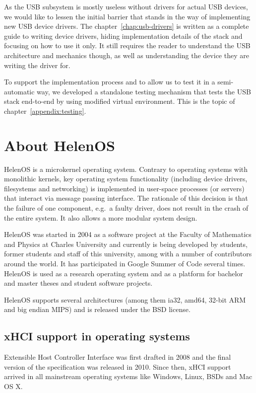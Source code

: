 As the USB subsystem is mostly useless without drivers for actual USB devices,
we would like to lessen the initial barrier that stands in the way of
implementing new USB device drivers. The chapter~\ref{chap:usb-drivers} is
written as a complete guide to writing device drivers, hiding implementation
details of the stack and focusing on how to use it only. It still requires the
reader to understand the USB architecture and mechanics though, as well as
understanding the device they are writing the driver for.

To support the implementation process and to allow us to test it in
a semi-automatic way, we developed a standalone testing mechanism that tests
the USB stack end-to-end by using modified virtual environment. This is the
topic of chapter~\ref{appendix:testing}.

\section{About HelenOS}
HelenOS is a microkernel operating system. Contrary to operating systems with
monolithic kernels, key operating system functionality (including device
drivers, filesystems and networking) is implemented in user-space processes (or
servers) that interact via message passing interface. The rationale of this
decision is that the failure of one component, e.g.\ a faulty driver, does not
result in the crash of the entire system. It also allows a more modular system
design.

HelenOS was started in 2004 as a software project at the Faculty of Mathematics
and Physics at Charles University and currently is being developed by students,
former students and staff of this university, among with a number of
contributors around the world. It has participated in Google Summer of Code
several times. HelenOS is used as a research operating system and as a platform
for bachelor and master theses and student software projects.

HelenOS supports several architectures (among them ia32, amd64, 32-bit ARM and
big endian MIPS) and is released under the BSD license.

\subsection{xHCI support in operating systems}
\label{subsect:support-in-oses}

Extensible Host Controller Interface was first drafted in 2008 and the final
version of the specification was released in 2010. Since then, xHCI support
arrived in all mainstream operating systems like Windows, Linux, BSDs and Mac
OS X.

